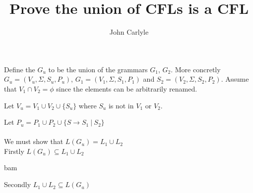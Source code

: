 \documentclass{article}
\author{John Carlyle}
\title{Prove the union of CFLs is a CFL}
\begin{document}
\maketitle

Define the $G_u$ to be the union of the grammars $G_1$, $G_2$. More concretly $G_u = (V_u,\Sigma,S_u,P_u)$, $G_1 = (V_1,\Sigma,S_1,P_1)$ and $S_2 = (V_2,\Sigma,S_2,P_2)$. Assume that $V_1 \cap V_2 = \phi$ since the elements can be arbitrarily renamed.

Let $V_u = V_1 \cup V_2 \cup \{S_u\}$ where $S_u$ is not in $V_1$ or $V_2$.

Let $P_u = P_1 \cup P_2 \cup \{S \rightarrow S_1 ~|~ S_2\}$\\\\

We must show that $L(G_u) = L_1 \cup L_2$\\
Firstly $L(G_u) \subseteq L_1 \cup L_2$
\begin{center}
  bam
\end{center}


Secondly $L_1 \cup L_2 \subseteq L(G_u)$
\end{document}
